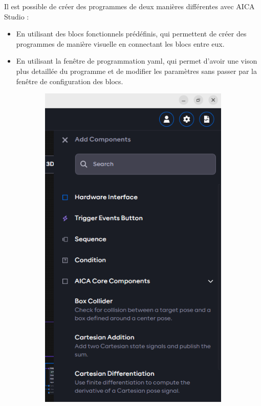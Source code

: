 Il est possible de créer des programmes de deux manières différentes avec AICA Studio :
\begin{itemize}
    \item En utilisant des blocs fonctionnels prédéfinis, qui permettent de créer des programmes de manière visuelle en connectant les blocs entre eux.
    \item En utilisant la fenêtre de programmation \gls{yaml}, qui permet d'avoir une vison plus detaillée du programme et de modifier les paramètres sans passer par la fenêtre de configuration des blocs.
\end{itemize}

\begin{figure}[H]
    \centering
    \begin{subfigure}{0.48\textwidth}
        \centering
        \includegraphics[width=0.95\linewidth]{assets/figures/AICA_blocs_fonct.png}

\end{subfigure}
\end{figure}
